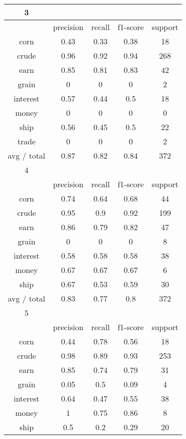 \documentclass[11pt]{article}
\begin{document}
\begin{center}
\begin{longtable}{| c | c | c | c | c |}
3           &           &        &          &         \\
\hline
           & precision & recall & f1-score & support \\

corn        & 0.43      & 0.33   & 0.38     & 18      \\
crude       & 0.96      & 0.92   & 0.94     & 268     \\
earn        & 0.85      & 0.81   & 0.83     & 42      \\
grain       & 0         & 0      & 0        & 2       \\
interest    & 0.57      & 0.44   & 0.5      & 18      \\
money       & 0         & 0      & 0        & 0       \\
ship        & 0.56      & 0.45   & 0.5      & 22      \\
trade       & 0         & 0      & 0        & 2       \\

avg / total & 0.87      & 0.82   & 0.84     & 372     \\
\hline

4           &           &        &          &         \\
\hline
           & precision & recall & f1-score & support \\

corn        & 0.74      & 0.64   & 0.68     & 44      \\
crude       & 0.95      & 0.9    & 0.92     & 199     \\
earn        & 0.86      & 0.79   & 0.82     & 47      \\
grain       & 0         & 0      & 0        & 8       \\
interest    & 0.58      & 0.58   & 0.58     & 38      \\
money       & 0.67      & 0.67   & 0.67     & 6       \\
ship        & 0.67      & 0.53   & 0.59     & 30      \\

avg / total & 0.83      & 0.77   & 0.8      & 372     \\
\hline

5           &           &        &          &         \\
\hline
           & precision & recall & f1-score & support \\

corn        & 0.44      & 0.78   & 0.56     & 18      \\
crude       & 0.98      & 0.89   & 0.93     & 253     \\
earn        & 0.85      & 0.74   & 0.79     & 31      \\
grain       & 0.05      & 0.5    & 0.09     & 4       \\
interest    & 0.64      & 0.47   & 0.55     & 38      \\
money       & 1         & 0.75   & 0.86     & 8       \\
ship        & 0.5       & 0.2    & 0.29     & 20      \\


\end{longtable}
\end{center}
\end{document}
